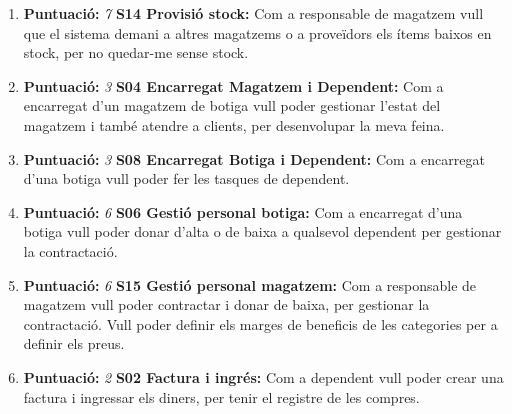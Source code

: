 \documentclass[a4paper,12pt]{article}
\begin{document}
\begin{enumerate}
	\item\textbf{Puntuació:} \textit{7} \textbf{S14 Provisió stock:} Com a responsable de magatzem vull que el sistema demani a altres magatzems o a proveïdors els ítems baixos en stock, per no quedar-me sense stock.
	
	\item\textbf{Puntuació:} \textit{3} \textbf{S04 Encarregat Magatzem i Dependent:} Com a encarregat d'un magatzem de botiga vull poder gestionar l'estat del magatzem i també atendre a clients, per desenvolupar la meva feina.
	
	\item\textbf{Puntuació:} \textit{3} \textbf{S08 Encarregat Botiga i Dependent:} Com a encarregat d'una botiga vull poder fer les tasques de dependent.
	
	\item\textbf{Puntuació:} \textit{6} \textbf{S06 Gestió personal botiga:} Com a encarregat d'una botiga vull poder donar d'alta o de baixa a qualsevol dependent per gestionar la contractació.
	
	\item\textbf{Puntuació:} \textit{6} \textbf{S15 Gestió personal magatzem:} Com a responsable de magatzem vull poder contractar i donar de baixa, per gestionar la contractació. Vull poder definir els marges de beneficis de les categories per a definir els preus.
	
	\item\textbf{Puntuació:} \textit{2} \textbf{S02 Factura i ingrés:} Com a dependent vull poder crear una factura i ingressar els diners, per tenir el registre de les compres.
\end{enumerate}
\end{document}
